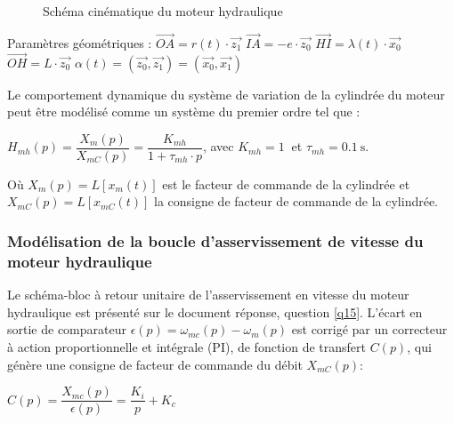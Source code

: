 \begin{figure}[ht!]
\begin{center}
  \def\svgwidth{0.65\linewidth}
  
 \end{center}
  \caption{Schéma cinématique du moteur hydraulique}
\label{fig10}
\end{figure}

Paramètres géométriques :
$\overrightarrow{OA}=r(t)\cdot\vec{z_1}$ \hfill
$\overrightarrow{IA}=-e\cdot\vec{z_0}$ \hfill
$\overrightarrow{HI}=\lambda(t)\cdot\vec{x_0}$ \hfill
$\overrightarrow{OH}=L\cdot\vec{z_0}$ \hfill
$\alpha(t)=(\vec{z_0},\vec{z_1})=(\vec{x_0},\vec{x_1})$



\newpage

Le comportement dynamique du système de variation de la cylindrée du moteur peut être modélisé comme un système du premier ordre tel que :
\begin{center}
$H_{mh}(p)=\dfrac{X_m(p)}{X_{mC}(p)}=\dfrac{K_{mh}}{1+\tau_{mh}\cdot p}$, avec $K_{mh}=\SI{1}{}$ et $\tau_{mh}=\SI{0,1}{\s}$.
\end{center}

Où $X_m(p)=L[x_m(t)]$ est le facteur de commande de la cylindrée et $X_{mC}(p)=L[x_{mC}(t)]$ la consigne de facteur de commande de la cylindrée.

\subsubsection{Modélisation de la boucle d'asservissement de vitesse du moteur hydraulique}

Le schéma-bloc à retour unitaire de l'asservissement en vitesse du moteur hydraulique est présenté sur le document réponse, question \ref{q15}. L'écart en sortie de comparateur $\epsilon(p)=\omega_{mc}(p)-\omega_{m}(p)$ est corrigé par un correcteur à action proportionnelle et intégrale (PI), de fonction de transfert $C(p)$, qui génère une consigne de facteur de commande du débit $X_{mC}(p)$:
\begin{center}
$C(p)=\dfrac{X_{mc}(p)}{\epsilon(p)}=\dfrac{K_i}{p}+K_c$
\end{center}

